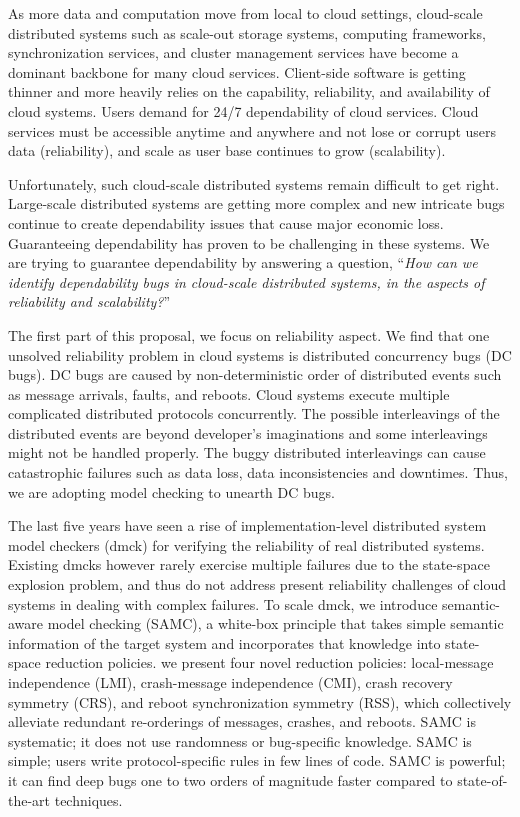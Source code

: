 As more data and computation move from local to cloud settings, cloud-scale
distributed systems such as scale-out storage systems, computing frameworks,
synchronization services, and cluster management services have become a dominant
backbone for many cloud services. Client-side software is getting thinner and
more heavily relies on the capability, reliability, and availability of cloud
systems. Users demand for 24/7 dependability of cloud services. Cloud services
must be accessible anytime and anywhere and not lose or corrupt users data
(reliability), and scale as user base continues to grow (scalability). 

Unfortunately, such cloud-scale distributed systems remain difficult to get
right. Large-scale distributed systems are getting more complex and new
intricate bugs continue to create dependability issues that cause major economic
loss. Guaranteeing dependability has proven to be challenging in these systems.
We are trying to guarantee dependability by answering a question, ``{\em How can
we identify dependability bugs in cloud-scale distributed systems, in the
aspects of reliability and scalability?}''

The first part of this proposal, we focus on reliability aspect. We find that
one unsolved reliability problem in cloud systems is distributed concurrency
bugs (DC bugs). DC bugs are caused by non-deterministic order of distributed
events such as message arrivals, faults, and reboots. Cloud systems execute
multiple complicated distributed protocols concurrently. The possible
interleavings of the distributed events are beyond developer's imaginations and
some interleavings might not be handled properly. The buggy distributed
interleavings can cause catastrophic failures such as data loss, data
inconsistencies and downtimes. Thus, we are adopting model checking to unearth
DC bugs.

The last five years have seen a rise of implementation-level distributed system
model checkers (dmck) for verifying the reliability of real distributed systems.
Existing dmcks however rarely exercise multiple failures due to the state-space
explosion problem, and thus do not address present reliability challenges of
cloud systems in dealing with complex failures. To scale dmck, we introduce
semantic-aware model checking (SAMC), a white-box principle that takes simple
semantic information of the target system and incorporates that knowledge into
state-space reduction policies. we present four novel reduction policies:
local-message independence (LMI), crash-message independence (CMI), crash
recovery symmetry (CRS), and reboot synchronization symmetry (RSS), which
collectively alleviate redundant re-orderings of messages, crashes, and reboots.
SAMC is systematic; it does not use randomness or bug-specific knowledge.  SAMC
is simple; users write protocol-specific rules in few lines of code. SAMC is
powerful; it can find deep bugs one to two orders of magnitude faster compared
to state-of-the-art techniques. 

